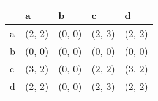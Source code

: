 \begin{tabular}{lllll}
\toprule
{} &       a &       b &       c &       d \\
\midrule
a &  (2, 2) &  (0, 0) &  (2, 3) &  (2, 2) \\
b &  (0, 0) &  (0, 0) &  (0, 0) &  (0, 0) \\
c &  (3, 2) &  (0, 0) &  (2, 2) &  (3, 2) \\
d &  (2, 2) &  (0, 0) &  (2, 3) &  (2, 2) \\
\bottomrule
\end{tabular}
